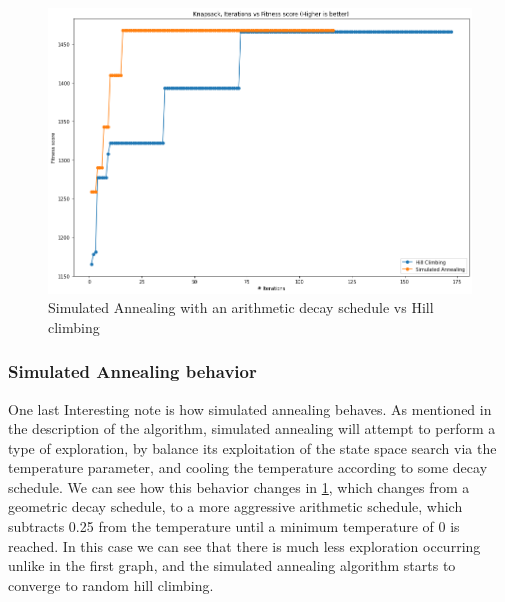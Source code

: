 \documentclass[
letterpaper, %
]{IEEEtran}
\begin{document}
	\begin{figure}[h]
		\centering
		\includegraphics[width=.9\linewidth]{./images/exp1SaVsHc.png}
		\caption{Simulated Annealing with an arithmetic decay schedule vs Hill climbing}
		\label{fig:exp1SaVsHc}
	\end{figure}
	
	\subsubsection{Simulated Annealing behavior}
	One last Interesting note is how simulated annealing behaves. As mentioned in the description of the algorithm, simulated annealing will attempt to perform a type of exploration, by balance its exploitation of the state space search via the temperature parameter, and cooling the temperature according to some decay schedule. We can see how this behavior changes in \ref{fig:exp1SaVsHc}, which changes from a geometric decay schedule, to a more aggressive arithmetic schedule, which subtracts 0.25 from the temperature until a minimum temperature of 0 is reached. In this case we can see that there is much less exploration occurring unlike in the first graph, and the simulated annealing algorithm starts to converge to random hill climbing.
	
\end{document}
